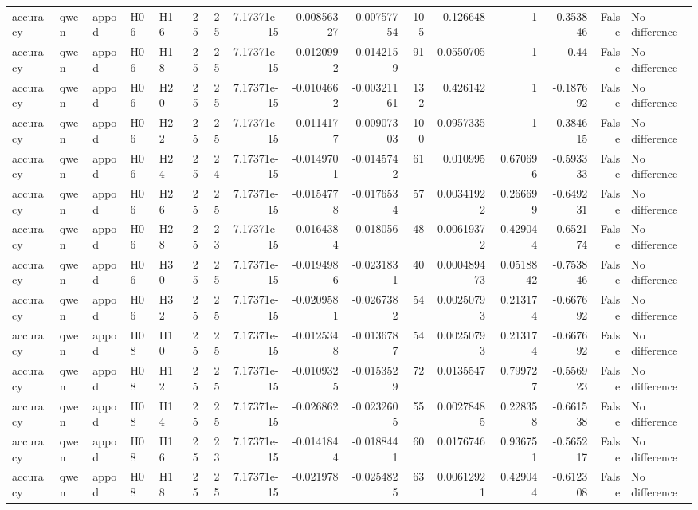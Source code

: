 \begin{longtable}{lllllrrrrrrrrrrl}
accuracy & qwen & appod & H06 & H16 & 25 & 25 & 7.17371e-15 & -0.00856327 & -0.00757754 & 105 & 0.126648 & 1 & -0.353846 & False & No difference \\
accuracy & qwen & appod & H06 & H18 & 25 & 25 & 7.17371e-15 & -0.0120992 & -0.0142159 & 91 & 0.0550705 & 1 & -0.44 & False & No difference \\
accuracy & qwen & appod & H06 & H20 & 25 & 25 & 7.17371e-15 & -0.0104662 & -0.00321161 & 132 & 0.426142 & 1 & -0.187692 & False & No difference \\
accuracy & qwen & appod & H06 & H22 & 25 & 25 & 7.17371e-15 & -0.0114177 & -0.00907303 & 100 & 0.0957335 & 1 & -0.384615 & False & No difference \\
accuracy & qwen & appod & H06 & H24 & 25 & 24 & 7.17371e-15 & -0.0149701 & -0.0145742 & 61 & 0.010995 & 0.670696 & -0.593333 & False & No difference \\
accuracy & qwen & appod & H06 & H26 & 25 & 25 & 7.17371e-15 & -0.0154778 & -0.0176534 & 57 & 0.00341922 & 0.266699 & -0.649231 & False & No difference \\
accuracy & qwen & appod & H06 & H28 & 25 & 23 & 7.17371e-15 & -0.0164384 & -0.018056 & 48 & 0.00619372 & 0.429044 & -0.652174 & False & No difference \\
accuracy & qwen & appod & H06 & H30 & 25 & 25 & 7.17371e-15 & -0.0194986 & -0.0231831 & 40 & 0.000489473 & 0.0518842 & -0.753846 & False & No difference \\
accuracy & qwen & appod & H06 & H32 & 25 & 25 & 7.17371e-15 & -0.0209581 & -0.0267382 & 54 & 0.00250793 & 0.213174 & -0.667692 & False & No difference \\
accuracy & qwen & appod & H08 & H10 & 25 & 25 & 7.17371e-15 & -0.0125348 & -0.0136787 & 54 & 0.00250793 & 0.213174 & -0.667692 & False & No difference \\
accuracy & qwen & appod & H08 & H12 & 25 & 25 & 7.17371e-15 & -0.0109325 & -0.0153529 & 72 & 0.0135547 & 0.799727 & -0.556923 & False & No difference \\
accuracy & qwen & appod & H08 & H14 & 25 & 25 & 7.17371e-15 & -0.026862 & -0.0232605 & 55 & 0.00278485 & 0.228358 & -0.661538 & False & No difference \\
accuracy & qwen & appod & H08 & H16 & 25 & 23 & 7.17371e-15 & -0.0141844 & -0.0188441 & 60 & 0.0176746 & 0.936751 & -0.565217 & False & No difference \\
accuracy & qwen & appod & H08 & H18 & 25 & 25 & 7.17371e-15 & -0.021978 & -0.0254825 & 63 & 0.00612921 & 0.429044 & -0.612308 & False & No difference \\

\end{longtable}
